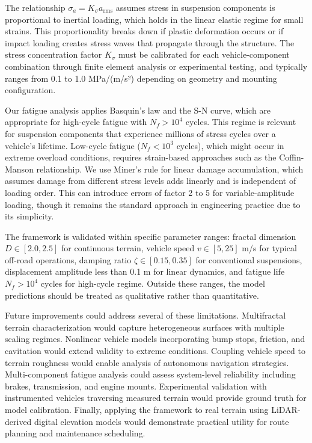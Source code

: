 \documentclass[11pt,letterpaper]{article}
\begin{document}
The relationship $\sigma_a = K_\sigma a_{\text{rms}}$ assumes stress in suspension components is proportional to inertial loading, which holds in the linear elastic regime for small strains. This proportionality breaks down if plastic deformation occurs or if impact loading creates stress waves that propagate through the structure. The stress concentration factor $K_\sigma$ must be calibrated for each vehicle-component combination through finite element analysis or experimental testing, and typically ranges from 0.1 to 1.0 MPa/(m/s²) depending on geometry and mounting configuration.

Our fatigue analysis applies Basquin's law and the S-N curve, which are appropriate for high-cycle fatigue with $N_f > 10^4$ cycles. This regime is relevant for suspension components that experience millions of stress cycles over a vehicle's lifetime. Low-cycle fatigue ($N_f < 10^3$ cycles), which might occur in extreme overload conditions, requires strain-based approaches such as the Coffin-Manson relationship. We use Miner's rule for linear damage accumulation, which assumes damage from different stress levels adds linearly and is independent of loading order. This can introduce errors of factor 2 to 5 for variable-amplitude loading, though it remains the standard approach in engineering practice due to its simplicity.

The framework is validated within specific parameter ranges: fractal dimension $D \in [2.0, 2.5]$ for continuous terrain, vehicle speed $v \in [5, 25]$ m/s for typical off-road operations, damping ratio $\zeta \in [0.15, 0.35]$ for conventional suspensions, displacement amplitude less than 0.1 m for linear dynamics, and fatigue life $N_f > 10^4$ cycles for high-cycle regime. Outside these ranges, the model predictions should be treated as qualitative rather than quantitative.

Future improvements could address several of these limitations. Multifractal terrain characterization would capture heterogeneous surfaces with multiple scaling regimes. Nonlinear vehicle models incorporating bump stops, friction, and cavitation would extend validity to extreme conditions. Coupling vehicle speed to terrain roughness would enable analysis of autonomous navigation strategies. Multi-component fatigue analysis could assess system-level reliability including brakes, transmission, and engine mounts. Experimental validation with instrumented vehicles traversing measured terrain would provide ground truth for model calibration. Finally, applying the framework to real terrain using LiDAR-derived digital elevation models would demonstrate practical utility for route planning and maintenance scheduling.
\end{document}
